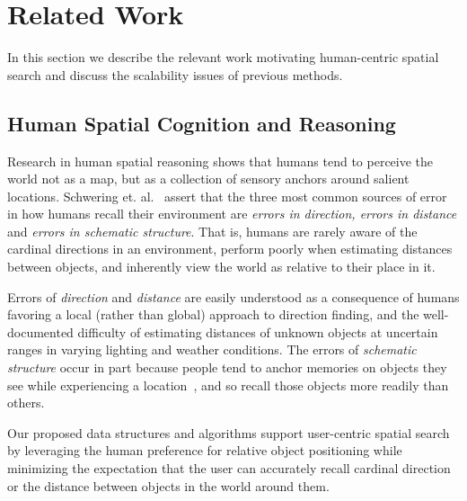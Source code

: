 \section{Related Work}
\label{section:related}

In this section we describe the relevant work motivating human-centric spatial search and discuss the scalability issues of previous methods.

\subsection{Human Spatial Cognition and Reasoning}
\par{Research in human spatial reasoning shows that humans tend to perceive the world not as a map, but as a collection of sensory anchors around salient locations. 
Schwering et. al.~\cite{Schwering2014} assert that the three most common sources of error in how humans recall their environment are \textit{errors in direction, errors in distance} and \textit{errors in schematic structure}.
That is, humans are rarely aware of the cardinal directions in an environment, perform poorly when estimating distances between objects, and inherently view the world as relative to their place in it.}
%
\par{Errors of \textit{direction} and \textit{distance} are easily understood as a consequence of humans favoring a local (rather than global) approach to direction finding, and the well-documented difficulty of estimating distances of unknown objects at uncertain ranges in varying lighting and weather conditions. 
The errors of \textit{schematic structure} occur in part because people tend to anchor memories on objects they see while experiencing a location~\cite{Helbing2020}, and so recall those objects more readily than others.}
% 
\par{Our proposed data structures and algorithms support user-centric spatial search by leveraging the human preference for relative object positioning while minimizing the expectation that the user can accurately recall cardinal direction or the distance between objects in the world around them.}

